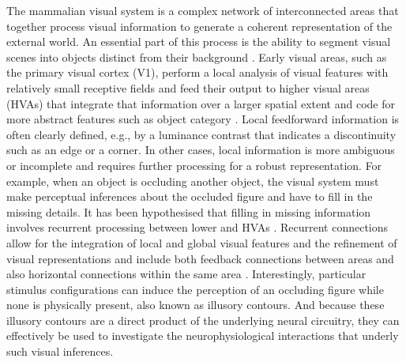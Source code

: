 \documentclass[12pt]{article}
\begin{document}
The mammalian visual system is a complex network of interconnected areas that together process visual information to generate a coherent representation of the external world. An essential part of this process is the ability to segment visual scenes into objects distinct from their background \autocite{kirchbergerEssentialRoleFeedback2020}. Early visual areas, such as the primary visual cortex (V1), perform a local analysis of visual features with relatively small receptive fields and feed their output to higher visual areas (HVAs) that integrate that information over a larger spatial extent and code for more abstract features such as object category \autocite{ashbridgeEffectImageOrientation2000}. Local feedforward information is often clearly defined, e.g., by a luminance contrast that indicates a discontinuity such as an edge or a corner. In other cases, local information is more ambiguous or incomplete and requires further processing for a robust representation. For example, when an object is occluding another object, the visual system must make perceptual inferences about the occluded figure and have to fill in the missing details. It has been hypothesised that filling in missing information involves recurrent processing between lower and HVAs \autocite{wyatteEarlyRecurrentFeedback2014}. Recurrent connections allow for the integration of local and global visual features and the refinement of visual representations and include both feedback connections between areas and also horizontal connections within the same area \autocite{roelfsemaCORTICALALGORITHMSPERCEPTUAL2006,shushruthStrongRecurrentNetworks2012}. Interestingly, particular stimulus configurations can induce the perception of an occluding figure while none is physically present, also known as illusory contours. And because these illusory contours are a direct product of the underlying neural circuitry, they can effectively be used to investigate the neurophysiological interactions that underly such visual inferences.
\end{document}
